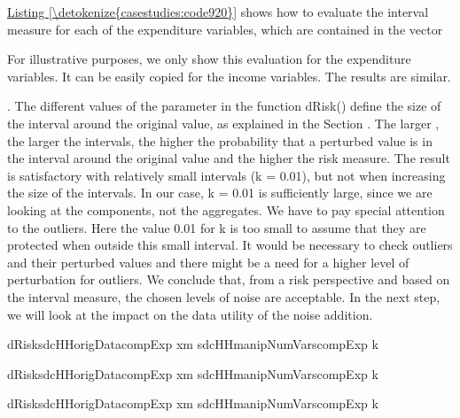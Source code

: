 \documentclass[letterpaper,10pt,english]{sphinxmanual}
\begin{document}
\hyperref[\detokenize{casestudies:code920}]{Listing \ref{\detokenize{casestudies:code920}}} shows how to evaluate the interval measure for each of the
expenditure variables, which are contained in the vector
\begin{footnote}[2]\sphinxAtStartFootnote
For illustrative purposes, we only show this evaluation for the
expenditure variables. It can be easily copied for the income
variables. The results are similar.
%
\end{footnote}. The different values of the parameter
 in the function dRisk() define the size of the interval around the
original value, as explained in the Section .
The larger , the
larger the intervals, the higher the probability that a perturbed value
is in the interval around the original value and the higher the risk
measure. The result is satisfactory with relatively small intervals (k =
0.01), but not when increasing the size of the intervals. In our case, k
= 0.01 is sufficiently large, since we are looking at the components,
not the aggregates. We have to pay special attention to the outliers.
Here the value 0.01 for k is too small to assume that they are protected
when outside this small interval. It would be necessary to check
outliers and their perturbed values and there might be a need for a
higher level of perturbation for outliers. We conclude that, from a risk
perspective and based on the interval measure, the chosen levels of
noise are acceptable. In the next step, we will look at the impact on
the data utility of the noise addition.

\def\sphinxLiteralBlockLabel{\label{\detokenize{casestudies:code920}}}
%
\begin{sphinxVerbatim}[commandchars=\\\{\},numbers=left,firstnumber=1,stepnumber=1]
dRisksdcHHorigData\PYG{p}{[}compExp\PYG{p}{]} xm  sdcHHmanipNumVars\PYG{p}{[}compExp\PYG{p}{]} k  
\PYG{p}{[}\PYG{p}{]} 

dRisksdcHHorigData\PYG{p}{[}compExp\PYG{p}{]} xm  sdcHHmanipNumVars\PYG{p}{[}compExp\PYG{p}{]} k  
\PYG{p}{[}\PYG{p}{]} 

dRisksdcHHorigData\PYG{p}{[}compExp\PYG{p}{]} xm  sdcHHmanipNumVars\PYG{p}{[}compExp\PYG{p}{]} k  
\PYG{p}{[}\PYG{p}{]} 
\end{sphinxVerbatim}
\end{document}

